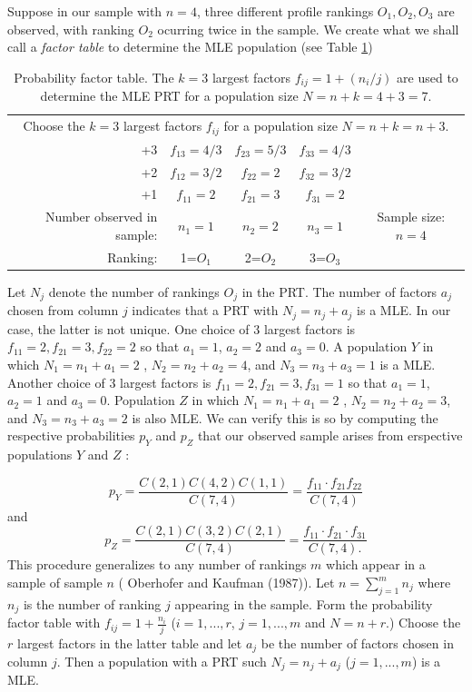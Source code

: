 \documentclass[a4paper, 12pt]{article}
\begin{document}
Suppose in our sample with $n=4$,  three different profile rankings $O_1,O_2,O_3$ are observed, with ranking $O_2$ ocurring twice in the sample. We create what we shall call a \emph{factor table} to determine the MLE population (see Table \ref{FT}) 
\begin{table}[!htpb]
	\scriptsize
	\centering
	\begin{tabular}{r|ccc|c}\hline
		\multicolumn{5}{c}{Choose the $k=3$ largest factors $f_{ij}$ for a population size $N=n+k=n+3$.}\\ 
		+3& $f_{13}=4/3$ & $f_{23}=5/3$&$f_{33}=4/3$&\\
		+2& $f_{12}=3/2$ & $f_{22}=2$ &$f_{32}=3/2 $&\\
		+1& $f_{11}=2$  &$f_{21}=3$&$f_{31}=2 $ &\\\hline
		Number observed in sample:&$n_1=1$& $n_2=2$ & $n_3=1$ & Sample size: $n=4$\\\hline
		Ranking:&1=$O_1$&2=$O_2$&3=$O_3$
	\end{tabular}
	\caption{Probability factor table. The $k=3$ largest factors $f_{ij}=1+(n_i/j)$ are used to determine the MLE PRT for a population size $N=n+k=4+3=7$. }
	\label{FT}
\end{table}
{\flushleft  Let} $N_j$ denote the number of rankings $O_j$ in the PRT.  The number of factors $a_j$ chosen from column $j$ indicates that a  PRT with $N_j= n_j+a_j$ is a MLE.    In our case, the latter is not unique.  One choice of 3 largest factors is $f_{11}=2, f_{21}=3,f_{22}=2$ so that $a_1=1$, $a_2=2$ and $a_3=0$. A population $Y$ in which $N_1=n_1+a_1=2$ , $N_2=n_2+a_2=4$, and $N_3=n_3+a_3=1$ is a MLE. Another choice of 3 largest factors  is $f_{11}=2, f_{21}=3,f_{31}=1$ so that $a_1=1$, $a_2=1$ and $a_3=0$. Population $Z$ in which $N_1=n_1+a_1=2$ , $N_2=n_2+a_2=3$, and $N_3=n_3+a_3=2$ is also MLE. We can verify this is so by computing the respective probabilities $p_Y$ and $p_Z$ that our observed sample arises from erspective populations $Y$ and $Z$ :

\begin{equation}
p_Y=\frac{C(2,1)C(4,2)C(1,1)}{C(7,4)}=\frac{f_{11} \cdot f_{21}f_{22}}{C(7,4)}
\end{equation}
{\flushleft and }
\begin{equation}
p_Z=\frac{C(2,1)C(3,2)C(2,1)}{C(7,4)}=\frac{f_{11}\cdot f_{21}\cdot f_{31}}{C(7,4).}
\end{equation}
{\flushleft This} procedure generalizes to any number of rankings $m$ which appear in a sample of sample $n$ ( Oberhofer and Kaufman (1987)). Let $n=\sum_{j=1}^m n_j$ where $n_j$ is the number of ranking $j$ appearing in the sample.  Form the probability factor table with $f_{ij}=1+\frac{n_i}{j}$ ($i=1,...,r$, $j=1,...,m$ and $N=n+r$.)  Choose the $r$ largest factors in the latter table and let $a_j$ be the number of factors chosen in column $j$.  Then a population with a PRT such  $N_j=n_j+a_j$ ($j=1,...,m$) is a MLE. 
\end{document}
